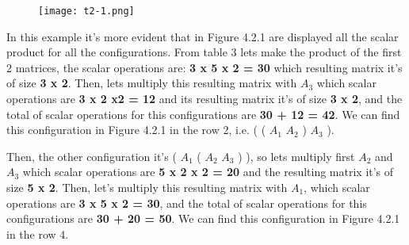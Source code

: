 \begin{figure}[H]
\texttt{[image: t2-1.png]}
\centering \linebreak {}
\end{figure} \hfill \break

In this example it's more evident that in Figure 4.2.1 are displayed all the scalar product for all the configurations. From table 3 lets make the product of the first 2 matrices, the scalar operations are: {\bfseries 3 x 5 x 2 = 30} which resulting matrix it's of size {\bfseries 3 x 2}. Then, lets multiply this resulting matrix with $A_{3}$ which scalar operations are {\bfseries 3 x 2 x2 = 12} and its resulting matrix it's of size {\bfseries 3 x 2}, and the total of scalar operations for this configurations are {\bfseries 30 + 12 = 42}. We can find this configuration in Figure 4.2.1 in the row 2, i.e. ( ( $A_{1}$ $A_{2}$ ) $A_{3}$ ). \hfill \break

Then, the other configuration it's ( $A_{1}$ ( $A_{2}$ $A_{3}$ ) ), so lets multiply first $A_{2}$ and $A_{3}$ which scalar operations are {\bfseries 5 x 2 x 2 = 20} and the resulting matrix it's of size {\bfseries 5 x 2}. Then, let's multiply this resulting matrix with $A_{1}$, which scalar operations are {\bfseries 3 x 5 x 2 = 30}, and the total of scalar operations for this configurations are {\bfseries 30 + 20 = 50}. We can find this configuration in Figure 4.2.1 in the row 4.

\pagebreak